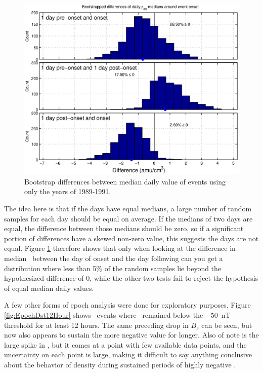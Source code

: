 \begin{figure}[htp!]
	\centering
	\includegraphics[width=1\linewidth]{Figures/DailyBootstrapDifferences-GOES6-case13}
	\caption{Bootstrap differences between median daily value of events using only the years of 1989-1991.}
	\label{fig:DailyBootstrapDifferences}
\end{figure}

The idea here is that if the days have equal medians, a large number of random samples for each day should be equal on average. If the medians of two days are equal, the difference between those medians should be zero, so if a significant portion of differences have a skewed non-zero value, this suggests the days are not equal. Figure \ref{fig:DailyBootstrapDifferences} therefore shows that only when looking at the difference in median \req\ between the day of onset and the day following can you get a distribution where less than 5\% of the random samples lie beyond the hypothesized difference of 0, while the other two tests fail to reject the hypothesis of equal median daily values.  

A few other forms of epoch analysis were done for exploratory purposes. Figure \ref{fig:EpochDst12Hour} shows \dst\ events where \dst\ remained below the $-50$~nT threshold for at least 12 hours. The same preceding drop in $B_z$ can be seen, but now also appears to sustain the more negative value for longer. Also of note is the large spike in \req, but it comes at a point with few available data points, and the uncertainty on each point is large, making it difficult to say anything conclusive about the behavior of density during sustained periods of highly negative \dst.

